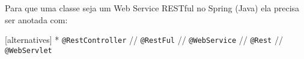Para que uma classe seja um Web Service RESTful no Spring (Java) ela precisa ser anotada com:

[alternatives]
* \texttt{@RestController}
//
\texttt{@RestFul}
//
\texttt{@WebService}
//
\texttt{@Rest}
//
\texttt{@WebServlet}
